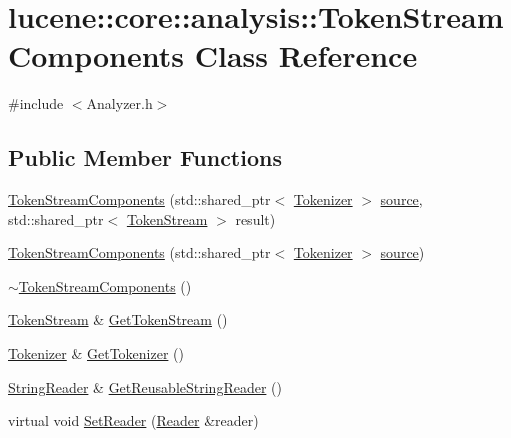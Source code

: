\hypertarget{classlucene_1_1core_1_1analysis_1_1TokenStreamComponents}{}\section{lucene\+:\+:core\+:\+:analysis\+:\+:Token\+Stream\+Components Class Reference}
\label{classlucene_1_1core_1_1analysis_1_1TokenStreamComponents}


{\ttfamily \#include $<$Analyzer.\+h$>$}

\subsection*{Public Member Functions}
\begin{DoxyCompactItemize}
\item 
\mbox{\hyperlink{classlucene_1_1core_1_1analysis_1_1TokenStreamComponents_ab911fac1d236284928d565686b00a1e9}{Token\+Stream\+Components}} (std\+::shared\+\_\+ptr$<$ \mbox{\hyperlink{classlucene_1_1core_1_1analysis_1_1Tokenizer}{Tokenizer}} $>$ \mbox{\hyperlink{classlucene_1_1core_1_1analysis_1_1TokenStreamComponents_ac09c35c45936a9f41350192482ede611}{source}}, std\+::shared\+\_\+ptr$<$ \mbox{\hyperlink{classlucene_1_1core_1_1analysis_1_1TokenStream}{Token\+Stream}} $>$ result)
\item 
\mbox{\hyperlink{classlucene_1_1core_1_1analysis_1_1TokenStreamComponents_a829335709cc2265b5ad9312f0292dd8e}{Token\+Stream\+Components}} (std\+::shared\+\_\+ptr$<$ \mbox{\hyperlink{classlucene_1_1core_1_1analysis_1_1Tokenizer}{Tokenizer}} $>$ \mbox{\hyperlink{classlucene_1_1core_1_1analysis_1_1TokenStreamComponents_ac09c35c45936a9f41350192482ede611}{source}})
\item 
\mbox{\hyperlink{classlucene_1_1core_1_1analysis_1_1TokenStreamComponents_a43c365ed5a31962f39757ffc372deb3e}{$\sim$\+Token\+Stream\+Components}} ()
\item 
\mbox{\hyperlink{classlucene_1_1core_1_1analysis_1_1TokenStream}{Token\+Stream}} \& \mbox{\hyperlink{classlucene_1_1core_1_1analysis_1_1TokenStreamComponents_ad3e5e31569074e0b2ee7cbcfec21bfda}{Get\+Token\+Stream}} ()
\item 
\mbox{\hyperlink{classlucene_1_1core_1_1analysis_1_1Tokenizer}{Tokenizer}} \& \mbox{\hyperlink{classlucene_1_1core_1_1analysis_1_1TokenStreamComponents_a53f16a2e0a1a23087357da68bcb79bd8}{Get\+Tokenizer}} ()
\item 
\mbox{\hyperlink{classlucene_1_1core_1_1analysis_1_1StringReader}{String\+Reader}} \& \mbox{\hyperlink{classlucene_1_1core_1_1analysis_1_1TokenStreamComponents_ab173058e2a4cb71b97953f0ae7f13d9a}{Get\+Reusable\+String\+Reader}} ()
\item 
virtual void \mbox{\hyperlink{classlucene_1_1core_1_1analysis_1_1TokenStreamComponents_a8687c0a013cc86cb0fc5a2f7a1f5b711}{Set\+Reader}} (\mbox{\hyperlink{classlucene_1_1core_1_1analysis_1_1Reader}{Reader}} \&reader)
\end{DoxyCompactItemize}
